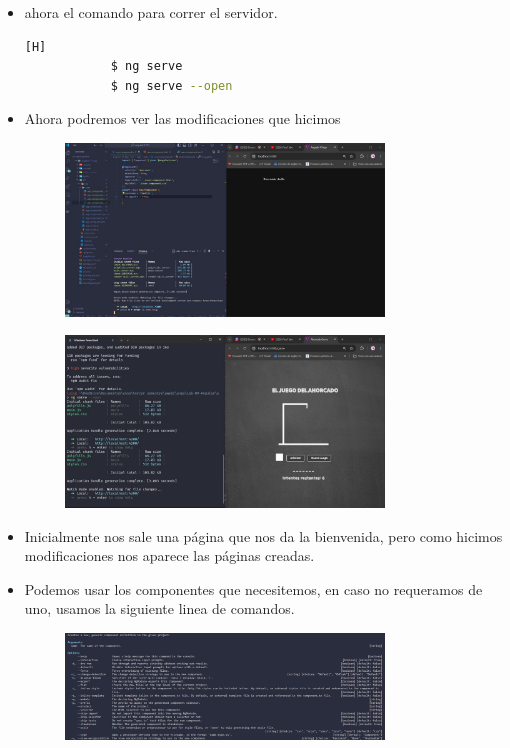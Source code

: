 \documentclass{article}
\begin{document}
\begin{itemize}
\begin{figure}[H]
		\end{figure}
		\item ahora el comando para correr el servidor.
		\begin{lstlisting}[language=bash,caption={Comandos del servidor}][H]
			$ ng serve
			$ ng serve --open
		\end{lstlisting}
		\item Ahora podremos ver las modificaciones que hicimos
		\begin{figure}[H]
			\centering
			\includegraphics[width=0.8\textwidth,keepaspectratio]{img/servidorInicio.jpg}
	
		\end{figure}
		\begin{figure}[H]
			\centering
			\includegraphics[width=0.8\textwidth,keepaspectratio]{img/iniciamos el servidor.jpg}
	
		\end{figure}
		\item Inicialmente nos sale una página que nos da la bienvenida, pero como hicimos modificaciones nos aparece las páginas creadas.
		\item Podemos usar los componentes que necesitemos, en caso no requeramos de uno, usamos la siguiente linea de comandos.
		\begin{figure}[H]
			\centering
			\includegraphics[width=0.8\textwidth,keepaspectratio]{img/comocrearcomponentes.jpg}
	

\end{figure}
\end{itemize}
\end{document}

